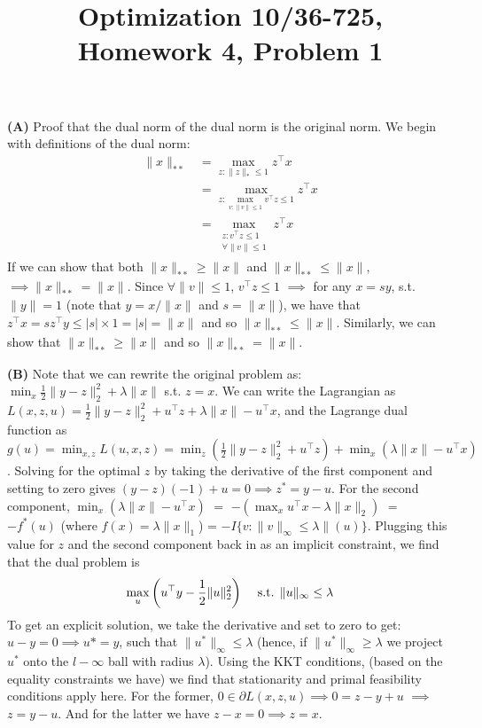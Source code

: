 \documentclass{article}
\title{Optimization 10/36-725, 
        Homework 4, Problem 1}
\author{}
\date{}
\begin{document}
\maketitle
\vspace{-6mm}

\textbf{(A)} Proof that the dual norm of the dual norm is the original norm. We
begin with definitions of the dual norm:
\begin{align*}
    \|x\|_{**} &= \max_{z : \|z\|_* \leq 1} z^\top x \\
               &= \max_{z : \max_{v : \|v\| \leq 1} v^\top z \leq 1} z^\top x \\
               &= \max_{\substack{ z : v^\top z \leq 1 \\ \forall \|v\| \leq 1}} z^\top x
\end{align*}
If we can show that both $ \|x\|_{**} \geq \|x\|$ and $\|x\|_{**} \leq \|x\|$,
$\implies  \|x\|_{**} = \|x\|$. Since $\forall \|v\| \leq 1$, $v^\top z \leq 1$
$\implies$ for any $x = sy$, s.t. $\|y\| = 1$ (note that $y = x/\|x\|$ and $s =
\|x\|$), we have that $z^\top x  = s z^\top y \leq |s| \times 1 = |s| = \|x\|$
and so $\|x\|_{**} \leq \|x\|$. Similarly, we can show that $ \|x\|_{**} \geq \|x\|$ 
and so $\|x\|_{**} = \|x\|$.

\textbf{(B)}
Note that we can rewrite the original problem as: $\min_x
\frac{1}{2}\|y-z\|_2^2 + \lambda \|x\|$ s.t. $z=x$. We can write the Lagrangian as
$L(x,z,u) = \frac{1}{2}\|y-z\|_2^2 + u^\top z + \lambda \|x\| - u^\top x$, 
and the Lagrange dual function as 
$g(u) = \min_{x,z} L(u,x,z) = \min_z \left( \frac{1}{2}\|y-z\|_2^2 + u^\top z \right) 
+ \min_x \left( \lambda \|x\| - u^\top x \right)$. Solving for the optimal
$z$ by taking the derivative of the first component 
and setting to zero gives $(y-z)(-1) + u = 0  \implies z^* = y-u$. 
For the second component, $\min_x \left( \lambda \|x\| - u^\top x \right)$
$=$ $-\left( \max_x u^\top x - \lambda \|x\|_2 \right)$ $=$ 
$-f^*(u)$ (where $f(x) = \lambda \|x\|_1$) = $-I \{v: \|v\|_\infty \leq \lambda\|(u) \}$.
Plugging this value for $z$ and the second component back in as an implicit
constraint, we find that the dual problem is 
\begin{align*}
    \max_u \left( u^\top y - \frac{1}{2}\|u\|_2^2 \right) \hspace{3mm} \text{ s.t. }
    \|u\|_\infty \leq \lambda
\end{align*}
To get an explicit solution, we take the derivative and set to zero to get: $u-y=0 \implies u*=y$, such that
$\|u^*\|_\infty \leq \lambda$ (hence, if $\|u^*\|_\infty \geq \lambda$ we project $u^*$
onto the $l-\infty$ ball with radius $\lambda$).
Using the KKT conditions, (based on the equality constraints we have) we find that 
stationarity and primal feasibility conditions apply here. For the former,
$0 \in \partial L(x,z,u) \implies 0 = z - y + u $ $\implies$ $z = y-u$.
And for the latter we have $z-x=0 \implies z=x$.
\\
\end{document}
